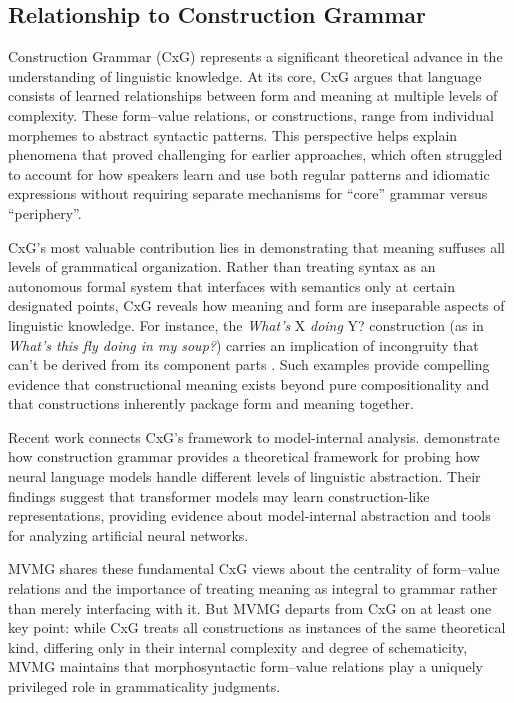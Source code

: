 \documentclass[12pt,letterpaper]{article}
\begin{document}
\subsection{Relationship to Construction Grammar}

Construction Grammar (CxG) \autocite{fillmore1988mechanisms, kay1999grammatical,  goldberg1995constructions, goldberg2019, sag2012sign} represents a significant theoretical advance in the understanding of linguistic knowledge. At its core, CxG argues that language consists of learned relationships between form and meaning at multiple levels of complexity. These form--value relations, or constructions, range from individual morphemes to abstract syntactic patterns. This perspective helps explain phenomena that proved challenging for earlier approaches, which often struggled to account for how speakers learn and use both regular patterns and idiomatic expressions without requiring separate mechanisms for \enquote{core} grammar versus \enquote{periphery}.

CxG's most valuable contribution lies in demonstrating that meaning suffuses all levels of grammatical organization. Rather than treating syntax as an autonomous formal system that interfaces with semantics only at certain designated points, CxG reveals how meaning and form are inseparable aspects of linguistic knowledge. For instance, the \textit{What's} X \textit{doing} Y? construction (as in \textit{What's this fly doing in my soup?}) carries an implication of incongruity that can't be derived from its component parts \autocite{kay1999grammatical}. Such examples provide compelling evidence that constructional meaning exists beyond pure compositionality and that constructions inherently package form and meaning together.

Recent work connects CxG's framework to model-internal analysis. \textcite{weissweiler2023construction} demonstrate how construction grammar provides a theoretical framework for probing how neural language models handle different levels of linguistic abstraction. Their findings suggest that transformer models may learn construction-like representations, providing evidence about model-internal abstraction and tools for analyzing artificial neural networks.

MVMG shares these fundamental CxG views about the centrality of form--value relations and the importance of treating meaning as integral to grammar rather than merely interfacing with it. But MVMG departs from CxG on at least one key point: while CxG treats all constructions as instances of the same theoretical kind, differing only in their internal complexity and degree of schematicity, MVMG maintains that morphosyntactic form--value relations play a uniquely privileged role in grammaticality judgments.
\end{document}
